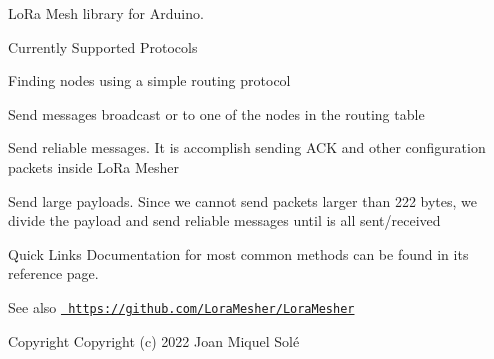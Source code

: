 Lo\+Ra Mesh library for Arduino.

\begin{DoxyParagraph}{Currently Supported Protocols}

\begin{DoxyItemize}
\item Finding nodes using a simple routing protocol
\item Send messages broadcast or to one of the nodes in the routing table
\item Send reliable messages. It is accomplish sending ACK and other configuration packets inside Lo\+Ra Mesher
\item Send large payloads. Since we cannot send packets larger than 222 bytes, we divide the payload and send reliable messages until is all sent/received
\end{DoxyItemize}
\end{DoxyParagraph}
\begin{DoxyParagraph}{Quick Links}
Documentation for most common methods can be found in its reference page.~\newline
 
\end{DoxyParagraph}
\begin{DoxySeeAlso}{See also}
\href{https://github.com/LoraMesher/LoraMesher}{\texttt{ https\+://github.\+com/\+Lora\+Mesher/\+Lora\+Mesher}}
\end{DoxySeeAlso}
\begin{DoxyCopyright}{Copyright}
Copyright (c) 2022 Joan Miquel Solé 
\end{DoxyCopyright}
